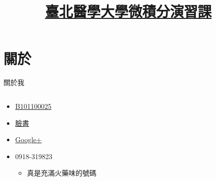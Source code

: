 


\title[微積分演習課]{\href{https://jdh8.github.io/calculus-slides/Introduction.pdf}{臺北醫學大學微積分演習課}}
\maketitle

\section{關於}
\begin{frame}{關於我}
    \begin{columns}[onlytextwidth]
        \begin{column}{0.6\textwidth}
            \begin{itemize}
                \item \href{http://my2.tmu.edu.tw/b101100025}{B101100025}
                \item \href{https://www.facebook.com/jdh863}{臉書}
                \item \href{https://plus.google.com/+\%E4\%BD\%95\%E9\%9C\%87\%E9\%82\%A6-jdh8}{Google+}
                \item 0918-319823
                    \begin{itemize}
                        \item 真是充滿火藥味的號碼
                    \end{itemize}
            \end{itemize}
        \end{column}


\end{columns}
\end{frame}
